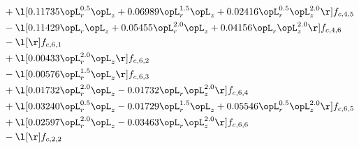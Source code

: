 \begin{alignat}{2}
& + \l[  0.11735 \opL_r^{0.5} \opL_z +  0.06989 \opL_r^{1.5} \opL_z +  0.02416 \opL_r^{0.5} \opL_z^{2.0}  \r] f_{c,4,5} \nonumber \\ 
& - \l[  0.11429 \opL_r \opL_z +  0.05455 \opL_r^{2.0} \opL_z +  0.04156 \opL_r \opL_z^{2.0}  \r] f_{c,4,6} \nonumber \\ 
& - \l[  \r] f_{c,6,1} \nonumber \\ 
& + \l[  0.00433 \opL_r^{2.0} \opL_z  \r] f_{c,6,2} \nonumber \\ 
& - \l[  0.00576 \opL_r^{1.5} \opL_z  \r] f_{c,6,3} \nonumber \\ 
& + \l[  0.01732 \opL_r^{2.0} \opL_z   -0.01732 \opL_r \opL_z^{2.0}  \r] f_{c,6,4} \nonumber \\ 
& + \l[  0.03240 \opL_r^{0.5} \opL_z   -0.01729 \opL_r^{1.5} \opL_z +  0.05546 \opL_r^{0.5} \opL_z^{2.0}  \r] f_{c,6,5} \nonumber \\ 
& + \l[  0.02597 \opL_r^{2.0} \opL_z   -0.03463 \opL_r \opL_z^{2.0}  \r] f_{c,6,6} \nonumber \\ 
& - \l[  \r] f_{c,2,2} \nonumber \\ 
\end{alignat} 


